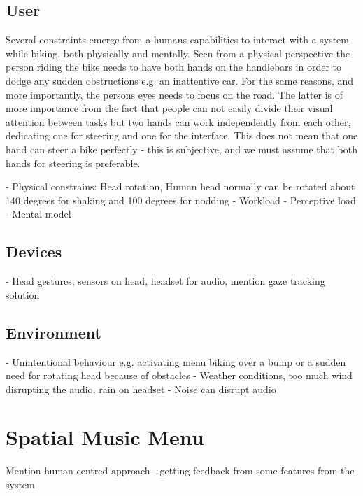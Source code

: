 

\subsection{User}
Several constraints emerge from a humans capabilities to interact with a system while biking, both physically and mentally. Seen from a physical perspective the person riding the bike needs to have both hands on the handlebars in order to dodge any sudden obstructions e.g. an inattentive car. For the same reasons, and more importantly, the persons eyes needs to focus on the road. The latter is of more importance from the fact that people can not easily divide their visual attention between tasks \cite{brewster_overcoming_2002} but two hands can work independently from each other, dedicating one for steering and one for the interface. This does not mean that one hand can steer a bike perfectly - this is subjective, and we must assume that both hands for steering is preferable.



- Physical constrains: Head rotation, Human head normally can be rotated about 140 degrees for shaking and 100 degrees for nodding \cite{lopresti_neck_2000}
- Workload
- Perceptive load
- Mental model

\subsection{Devices}
- Head gestures, sensors on head, headset for audio, mention gaze tracking solution

\subsection{Environment}
- Unintentional behaviour e.g. activating menu biking over a bump or a sudden need for rotating head because of obstacles
- Weather conditions, too much wind disrupting the audio, rain on headset
- Noise can disrupt audio


\section{Spatial Music Menu}
Mention human-centred approach - getting feedback from some features from the system

